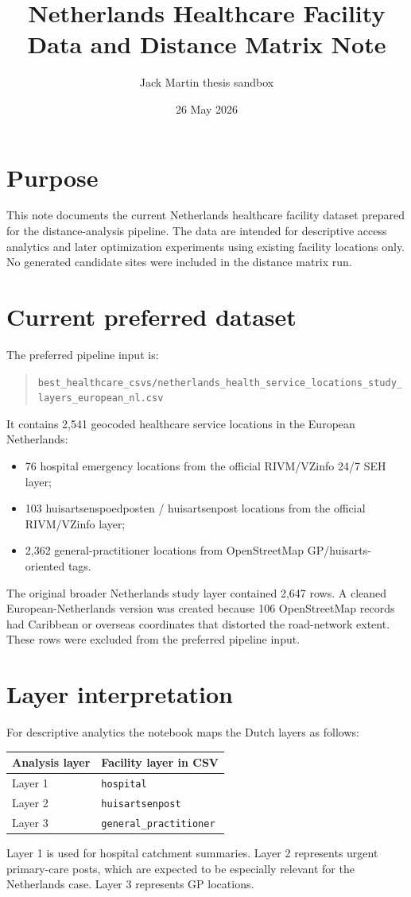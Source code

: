 \documentclass[11pt]{article}
\title{Netherlands Healthcare Facility Data and Distance Matrix Note}
\author{Jack Martin thesis sandbox}
\date{26 May 2026}
\begin{document}
\maketitle

\section*{Purpose}
This note documents the current Netherlands healthcare facility dataset prepared for the distance-analysis pipeline. The data are intended for descriptive access analytics and later optimization experiments using existing facility locations only. No generated candidate sites were included in the distance matrix run.

\section*{Current preferred dataset}
The preferred pipeline input is:
\begin{quote}
\texttt{best\_healthcare\_csvs/netherlands\_health\_service\_locations\_study\_layers\_european\_nl.csv}
\end{quote}
It contains 2,541 geocoded healthcare service locations in the European Netherlands:
\begin{itemize}[leftmargin=*]
  \item 76 hospital emergency locations from the official RIVM/VZinfo 24/7 SEH layer;
  \item 103 huisartsenspoedposten / huisartsenpost locations from the official RIVM/VZinfo layer;
  \item 2,362 general-practitioner locations from OpenStreetMap GP/huisarts-oriented tags.
\end{itemize}
The original broader Netherlands study layer contained 2,647 rows. A cleaned European-Netherlands version was created because 106 OpenStreetMap records had Caribbean or overseas coordinates that distorted the road-network extent. These rows were excluded from the preferred pipeline input.

\section*{Layer interpretation}
For descriptive analytics the notebook maps the Dutch layers as follows:
\begin{center}
\begin{tabular}{ll}
\toprule
Analysis layer & Facility layer in CSV \\
\midrule
Layer 1 & \texttt{hospital} \\
Layer 2 & \texttt{huisartsenpost} \\
Layer 3 & \texttt{general\_practitioner} \\
\bottomrule
\end{tabular}
\end{center}
Layer 1 is used for hospital catchment summaries. Layer 2 represents urgent primary-care posts, which are expected to be especially relevant for the Netherlands case. Layer 3 represents GP locations.
\end{document}
